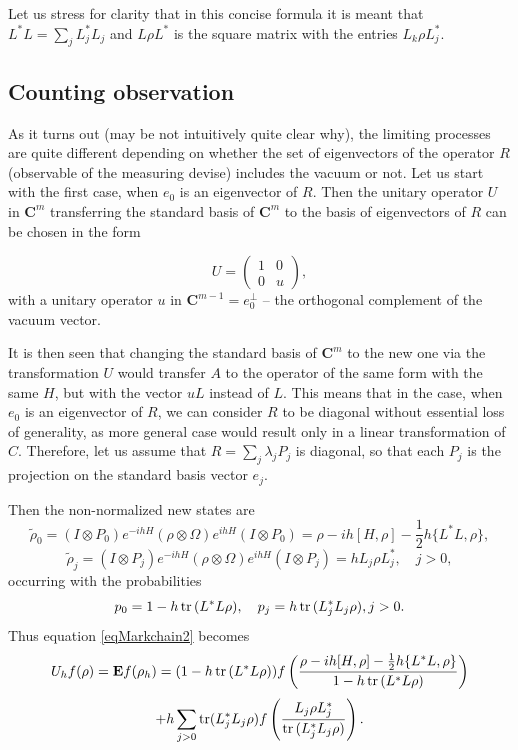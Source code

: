 \documentclass[12pt]{article}
\def\C{\mathbf{C}}
\def\E{\mathbf{E}}
\def\tr{\rm{tr}}
\newcommand{\la}{\lambda}
\newcommand{\Om}{\Omega}
\begin{document}
Let us stress for clarity that in this concise formula it is meant
 that $L^*L=\sum_j L_j^*L_j$ and $L\rho L^*$ is the square matrix
with the entries $L_k \rho L_j^*$.

\subsection{Counting observation}
\label{seccountcase}

As it turns out (may be not intuitively quite clear why),
the limiting processes are quite different depending on whether
the set of eigenvectors of the operator $R$ (observable of the measuring devise) includes the vacuum or not.
Let us start with the first case, when $e_0$ is an eigenvector of $R$.
Then the unitary operator $U$ in $\C^m$ transferring the standard basis
of $\C^m$ to the basis of eigenvectors of $R$ can be chosen in the form

\begin{equation}
\label{eqdiagonproj}
U= \begin{pmatrix} 1 & 0 \\ 0 & u \end{pmatrix},
\end{equation}
with a unitary operator $u$ in $\C^{m-1}=e_0^{\perp}$ -- the orthogonal complement of the vacuum vector.

It is then seen that changing the standard basis of $\C^m$ to the new one via the transformation $U$ would
transfer $A$ to the operator of the same form with the same $H$, but with the vector $uL$ instead of $L$.
This means that in the case, when $e_0$ is an eigenvector of $R$, we can consider $R$ to be diagonal without
essential loss of generality, as more general case would result only in a linear
transformation of $C$. Therefore, let us assume that $R=\sum_j \la_j P_j$ is diagonal, so that each $P_j$
is the projection on the standard basis vector $e_j$.

 Then the non-normalized new states are
\[
\tilde \rho_0=(I\otimes P_0) e^{-ihH} (\rho \otimes \Om) e^{ihH} (I\otimes P_0)
= \rho -ih[H, \rho] -\frac12 h\{L^*L,\rho\},
\]
\[
\tilde \rho_j=(I\otimes P_j) e^{-ihH} (\rho \otimes\Om) e^{ihH} (I\otimes P_j)
= hL_j\rho L_j^*, \quad j>0,
\]
occurring with the probabilities
\[
p_0=1-h \, {\tr} \, (L^*L \rho), \quad p_j=h \, {\tr}\, (L_j^*L_j \rho), j>0.
\]
Thus equation \eqref{eqMarkchain2} becomes
\[
U_h f(\rho)=\E f(\rho_h)=(1-h \, {\tr} \, (L^*L \rho))f
\left( \frac{\rho -ih[H, \rho] -\frac12 h\{L^*L,\rho\}}{1-h \, {\tr} \, (L^*L \rho)}\right)
\]
\begin{equation}
\label{eqMarkchaindiag}
+h \sum_{j>0} {\tr} (L_j^*L_j \rho) f\left(\frac{L_j \rho L_j^*}{{\tr}\, (L_j^*L_j \rho)}\right).
\end{equation}
\end{document}

